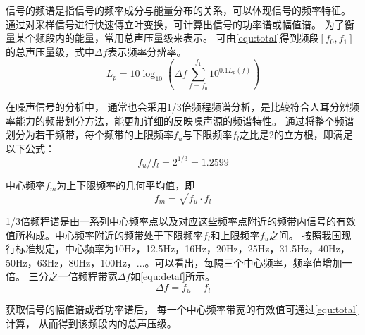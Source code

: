 信号的频谱是指信号的频率成分与能量分布的关系，可以体现信号的频率特征。
通过对采样信号进行快速傅立叶变换，可计算出信号的功率谱或幅值谱。
为了衡量某个频段内的能量，常用总声压量级来表示。
可由\autoref{equ:total}得到频段$\left [ f_0,f_1 \right ]$的总声压量级，式中$\Delta f$表示频率分辨率\cite{}。
\begin{equation}
    \label{equ:total}
    L_p=10\log_{10}{\left (\Delta f \sum_{f=f_0}^{f_1}10^{0.1L_p\left ( f \right )}    \right )  } 
\end{equation}

在噪声信号的分析中，
通常也会采用1/3倍频程频谱分析，是比较符合人耳分辨频率能力的频带划分方法，能更加详细的反映噪声源的频谱特性。
通过将整个频谱划分为若干频带，每个频带的上限频率$f_u$与下限频率$f_l$之比是2的立方根，即满足以下公式：
\begin{equation}
    \label{equ:fu}
    f_{u}/f_{l}=2^{1/3}=1.2599
\end{equation}

中心频率$f_{m}$为上下限频率的几何平均值，即
\begin{equation}
    \label{equ:fm}
    f_{m}=\sqrt{f_{u}\cdot f_{l} } 
\end{equation}

1/3倍频程谱是由一系列中心频率点以及对应这些频率点附近的频带内信号的有效值所构成。中心频率附近的频带处于下限频率$f_l$和上限频率$f_u$之间。
按照我国现行标准规定，中心频率为10Hz，12.5Hz，16Hz，20Hz，25Hz，31.5Hz，40Hz，50Hz，63Hz，80Hz，100Hz，...。可以看出，每隔三个中心频率，频率值增加一倍。
三分之一倍频程带宽$\Delta f$如\autoref{equ:detaf}所示。
\begin{equation}
    \label{equ:detaf}
    \Delta f=f_{u}-f_{l}
\end{equation}

获取信号的幅值谱或者功率谱后，
每一个中心频率带宽的有效值可通过\autoref{equ:total}计算，
从而得到该频段内的总声压级。

